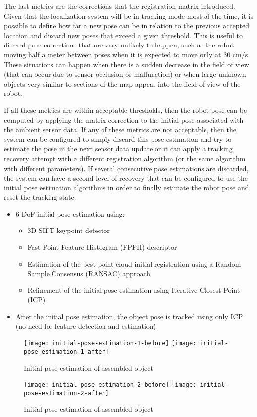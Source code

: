 The last metrics are the corrections that the registration matrix introduced. Given that the localization system will be in tracking mode most of the time, it is possible to define how far a new pose can be in relation to the previous accepted location and discard new poses that exceed a given threshold. This is useful to discard pose corrections that are very unlikely to happen, such as the robot moving half a meter between poses when it is expected to move only at 30 cm/s. These situations can happen when there is a sudden decrease in the field of view (that can occur due to sensor occlusion or malfunction) or when large unknown objects very similar to sections of the map appear into the field of view of the robot.

If all these metrics are within acceptable thresholds, then the robot pose can be computed by applying the matrix correction to the initial pose associated with the ambient sensor data. If any of these metrics are not acceptable, then the system can be configured to simply discard this pose estimation and try to estimate the pose in the next sensor data update or it can apply a tracking recovery attempt with a different registration algorithm (or the same algorithm with different parameters). If several consecutive pose estimations are discarded, the system can have a second level of recovery that can be configured to use the initial pose estimation algorithms in order to finally estimate the robot pose and reset the tracking state.


\begin{itemize}
	\item 6 DoF initial pose estimation using:
	\begin{itemize}
		\item 3D SIFT keypoint detector
		\item Fast Point Feature Histogram (FPFH) descriptor
		\item Estimation of the best point cloud initial registration using a Random Sample Consensus (RANSAC) approach
		\item Refinement of the initial pose estimation using Iterative Closest Point (ICP)
	\end{itemize}
	\item After the initial pose estimation, the object pose is tracked using only ICP (no need for feature detection and estimation)
\end{itemize}

\begin{figure}[!ht]
	\centering
	\texttt{[image: initial-pose-estimation-1-before]}
	\hspace{0.5em}
	\texttt{[image: initial-pose-estimation-1-after]}
	\caption{Initial pose estimation of assembled object}
\end{figure}

\begin{figure}[!ht]
	\centering
	\texttt{[image: initial-pose-estimation-2-before]}
	\hspace{0.5em}
	\texttt{[image: initial-pose-estimation-2-after]}
	\caption{Initial pose estimation of assembled object}
\end{figure}
